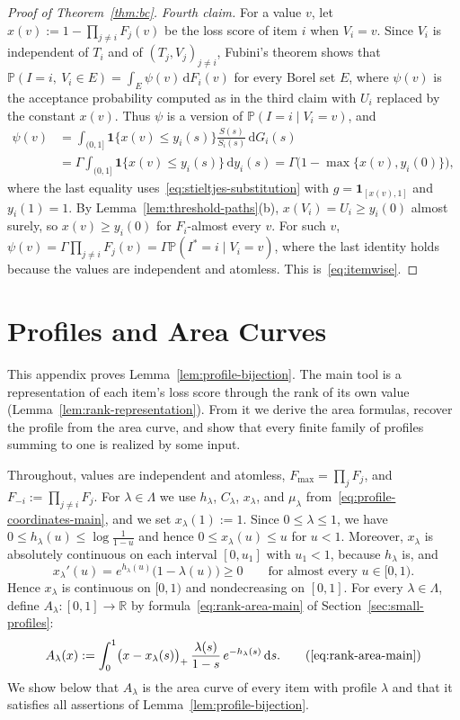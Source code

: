 \documentclass[11pt]{article}
\theoremstyle{definition}
\theoremstyle{remark}
\newcommand{\Pp}{\mathbb P}
\newcommand{\R}{\mathbb R}
\newcommand{\dd}{\,\mathrm d}
\newcommand{\ind}{\mathbf 1}
\begin{document}
\begin{proof}[Proof of Theorem~\ref{thm:bc}]
\emph{Fourth claim.}
For a value $v$, let $x(v):=1-\prod_{j\ne i}F_j(v)$ be the loss score of item $i$ when $V_i=v$.
Since $V_i$ is independent of $T_i$ and of $(T_j,V_j)_{j\ne i}$, Fubini's theorem shows that $\Pp(I=i,\ V_i\in E)=\int_E\psi(v)\dd F_i(v)$ for every Borel set $E$, where $\psi(v)$ is the acceptance probability computed as in the third claim with $U_i$ replaced by the constant $x(v)$.
Thus $\psi$ is a version of $\Pp(I=i\mid V_i=v)$, and
\[
\begin{aligned}
 \psi(v)
 &=\int_{(0,1]}\ind\bigl\{x(v)\le y_i(s)\bigr\}\frac{S(s)}{S_i(s)}\dd G_i(s)\\
 &=\Gamma\int_{(0,1]}\ind\bigl\{x(v)\le y_i(s)\bigr\}\dd y_i(s)
 =\Gamma\bigl(1-\max\{x(v),y_i(0)\}\bigr),
\end{aligned}
\]
where the last equality uses~\eqref{eq:stieltjes-substitution} with $g=\ind_{[x(v),1]}$ and $y_i(1)=1$.
By Lemma~\ref{lem:threshold-paths}(b), $x(V_i)=U_i\ge y_i(0)$ almost surely, so $x(v)\ge y_i(0)$ for $F_i$-almost every $v$.
For such $v$, $\psi(v)=\Gamma\prod_{j\ne i}F_j(v)=\Gamma\Pp(I^*=i\mid V_i=v)$, where the last identity holds because the values are independent and atomless.
This is~\eqref{eq:itemwise}.
\end{proof}

\section{Profiles and Area Curves}\label{app:profile}

This appendix proves Lemma~\ref{lem:profile-bijection}.
The main tool is a representation of each item's loss score through the rank of its own value (Lemma~\ref{lem:rank-representation}).
From it we derive the area formulas, recover the profile from the area curve, and show that every finite family of profiles summing to one is realized by some input.

Throughout, values are independent and atomless, $F_{\max}=\prod_jF_j$, and $F_{-i}:=\prod_{j\ne i}F_j$.
For $\lambda\in\Lambda$ we use $h_\lambda$, $C_\lambda$, $x_\lambda$, and $\mu_\lambda$ from~\eqref{eq:profile-coordinates-main}, and we set $x_\lambda(1):=1$.
Since $0\le\lambda\le1$, we have $0\le h_\lambda(u)\le\log\frac1{1-u}$ and hence $0\le x_\lambda(u)\le u$ for $u<1$.
Moreover, $x_\lambda$ is absolutely continuous on each interval $[0,u_1]$ with $u_1<1$, because $h_\lambda$ is, and
\[
 x_\lambda'(u)=e^{h_\lambda(u)}\bigl(1-\lambda(u)\bigr)\ge0
 \qquad\text{for almost every }u\in[0,1).
\]
Hence $x_\lambda$ is continuous on $[0,1)$ and nondecreasing on $[0,1]$.
For every $\lambda\in\Lambda$, define $A_\lambda:[0,1]\to\R$ by formula~\eqref{eq:rank-area-main} of Section~\ref{sec:small-profiles}:
\begin{equation*}
 A_\lambda(x):=\int_0^1\bigl(x-x_\lambda(s)\bigr)_+\,\frac{\lambda(s)}{1-s}\,e^{-h_\lambda(s)}\dd s.
 \tag{\ref*{eq:rank-area-main}}
\end{equation*}
We show below that $A_\lambda$ is the area curve of every item with profile $\lambda$ and that it satisfies all assertions of Lemma~\ref{lem:profile-bijection}.
\end{document}
